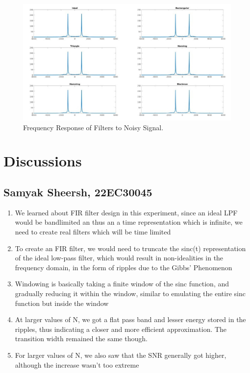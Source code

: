 \documentclass{article}
\begin{document}
    \begin{figure}[H]
    \includegraphics[width=\textwidth]
    {noisy_response.jpg}
    \caption{Frequency Response of Filters to Noisy Signal.}
    \end{figure}

\section{Discussions}
\subsection{Samyak Sheersh, 22EC30045}
\begin{enumerate}
    \item We learned about FIR filter design in this experiment, since an ideal LPF would be bandlimited an thus an a time representation which is infinite, we need to create real filters which will be time limited
    \item To create an FIR filter, we would need to truncate the sinc(t) representation of the ideal low-pass filter, which would result in non-idealities in the frequency domain, in the form of ripples due to the Gibbs' Phenomenon
    \item  Windowing is basically taking a finite window of the sinc function, and gradually reducing it within the window, similar to emulating the entire sinc function but inside the window
    \item At larger values of N, we got a flat pass band and lesser energy stored in the ripples, thus indicating a closer and more efficient approximation. The transition width remained the same though.
    \item For larger values of N, we also saw that the SNR generally got higher, although the increase wasn't too extreme
\end{enumerate}
\end{document}
